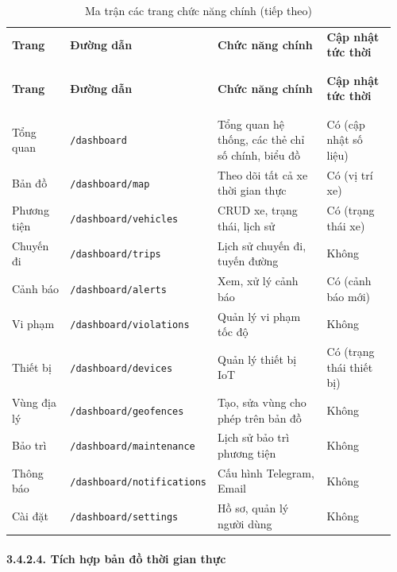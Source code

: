 \documentclass[a4paper]{extarticle}
\newcommand{\thesissettableid}[2]{%
  \renewcommand{\thetable}{#1}%
  \renewcommand{\theHtable}{#2}%
}
\begin{document}
{\thesissettableid{3.27}{tab-ch3-ma-tran-cac-trang-chuc-nang-chinh}
\def\LTcaptype{table}
\begin{longtable}{|L{0.179\linewidth}|L{0.158\linewidth}|L{0.385\linewidth}|L{0.233\linewidth}|}
\caption{Ma trận các trang chức năng chính}\label{tab:ch3-ma-tran-cac-trang-chuc-nang-chinh}\\
\hline \textbf{Trang} & \textbf{Đường dẫn} & \textbf{Chức năng chính} & \textbf{Cập nhật tức thời} \\
\\\hline
\endfirsthead
\caption[]{Ma trận các trang chức năng chính (tiếp theo)}\\
\hline \textbf{Trang} & \textbf{Đường dẫn} & \textbf{Chức năng chính} & \textbf{Cập nhật tức thời} \\
\\\hline
\endhead
\\\hline
\endfoot
\endlastfoot
Tổng quan & \texttt{/dashboard} & Tổng quan hệ thống, các thẻ chỉ số chính, biểu
đồ & Có (cập nhật số liệu) \\\hline
Bản đồ & \nolinkurl{/dashboard/map} & Theo dõi tất cả xe thời gian thực &
Có (vị trí xe) \\\hline
Phương tiện & \nolinkurl{/dashboard/vehicles} & CRUD xe, trạng thái, lịch
sử & Có (trạng thái xe) \\\hline
Chuyến đi & \nolinkurl{/dashboard/trips} & Lịch sử chuyến đi, tuyến đường &
Không \\\hline
Cảnh báo & \nolinkurl{/dashboard/alerts} & Xem, xử lý cảnh báo & Có (cảnh
báo mới) \\\hline
Vi phạm & \nolinkurl{/dashboard/violations} & Quản lý vi phạm tốc độ &
Không \\\hline
Thiết bị & \nolinkurl{/dashboard/devices} & Quản lý thiết bị IoT & Có
(trạng thái thiết bị) \\\hline
Vùng địa lý & \nolinkurl{/dashboard/geofences} & Tạo, sửa vùng cho phép trên bản
đồ & Không \\\hline
Bảo trì & \nolinkurl{/dashboard/maintenance} & Lịch sử bảo trì phương tiện
& Không \\\hline
Thông báo & \nolinkurl{/dashboard/notifications} & Cấu hình Telegram, Email
& Không \\\hline
Cài đặt & \nolinkurl{/dashboard/settings} & Hồ sơ, quản lý người dùng &
Không \\\hline
\end{longtable}
}


\paragraph{3.4.2.4. Tích hợp bản đồ thời gian thực}\label{3244-tuxedch-hux1ee3p-bux1ea3n-ux111ux1ed3-thux1eddi-gian-thux1ef1c-real-time-map-integration}
\end{document}
